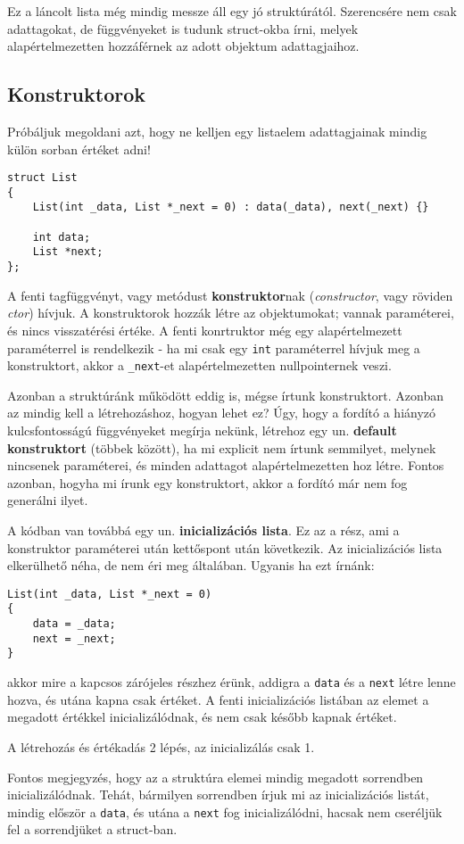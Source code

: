 \documentclass[a4paper,11.5pt,table]{article}
\begin{document}
	\medskip
	Ez a láncolt lista még mindig messze áll egy jó struktúrától. Szerencsére nem csak adattagokat, de függvényeket is tudunk struct-okba írni, melyek alapértelmezetten hozzáférnek az adott objektum adattagjaihoz.
	\subsection{Konstruktorok}
	Próbáljuk megoldani azt, hogy ne kelljen egy listaelem adattagjainak mindig külön sorban értéket adni!
	\begin{lstlisting}
struct List
{
	List(int _data, List *_next = 0) : data(_data), next(_next) {}
	
	int data;
	List *next;
};
	\end{lstlisting}
	A fenti tagfüggvényt, vagy metódust \textbf{konstruktor}nak (\textit{constructor}, vagy röviden \textit{ctor}) hívjuk. A konstruktorok hozzák létre az objektumokat; vannak paraméterei, és nincs visszatérési értéke. A fenti konrtruktor még egy alapértelmezett paraméterrel is rendelkezik - ha mi csak egy \texttt{int} paraméterrel hívjuk meg a konstruktort, akkor a \texttt{\_next}-et alapértelmezetten nullpointernek veszi.
	
	\medskip
	Azonban a struktúránk működött eddig is, mégse írtunk konstruktort. Azonban az mindig kell a létrehozáshoz, hogyan lehet ez? Úgy, hogy a fordító a hiányzó kulcsfontosságú függvényeket megírja nekünk, létrehoz egy un. \textbf{default konstruktort} (többek között), ha mi explicit nem írtunk semmilyet, melynek nincsenek paraméterei, és minden adattagot alapértelmezetten hoz létre. Fontos azonban, hogyha mi írunk egy konstruktort, akkor a fordító már nem fog generálni ilyet.
	
	\medskip
	A kódban van továbbá egy un. \textbf{inicializációs lista}. Ez az a rész, ami a konstruktor paraméterei után kettőspont után következik. Az inicializációs lista elkerülhető néha, de nem éri meg általában. Ugyanis ha ezt írnánk:
	\begin{lstlisting}
List(int _data, List *_next = 0)
{
	data = _data;
	next = _next;
}
	\end{lstlisting}
	akkor mire a kapcsos zárójeles részhez érünk, addigra a \texttt{data} és a \texttt{next} létre lenne hozva, és utána kapna csak értéket. A fenti inicializációs listában az elemet a megadott értékkel inicializálódnak, és nem csak később kapnak értéket.
	\begin{note}
		A létrehozás és értékadás 2 lépés, az inicializálás csak 1.
	\end{note}
	Fontos megjegyzés, hogy az a struktúra elemei mindig megadott sorrendben inicializálódnak. Tehát, bármilyen sorrendben írjuk mi az inicializációs listát, mindig először a \texttt{data}, és utána a \texttt{next} fog inicializálódni, hacsak nem cseréljük fel a sorrendjüket a struct-ban.
\end{document}
